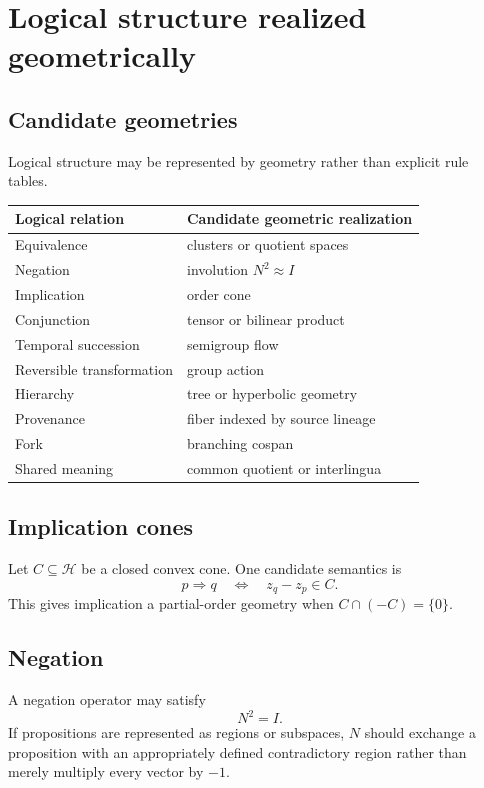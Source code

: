 \documentclass[11pt]{article}
\theoremstyle{definition}
\theoremstyle{remark}
\newcommand{\Lat}{\mathcal H}
\begin{document}
\section{Logical structure realized geometrically}

\subsection{Candidate geometries}

Logical structure may be represented by geometry rather than explicit rule tables.

\begin{center}
\begin{tabular}{ll}
\toprule
Logical relation & Candidate geometric realization \\
\midrule
Equivalence & clusters or quotient spaces \\
Negation & involution \(N^2\approx I\) \\
Implication & order cone \\
Conjunction & tensor or bilinear product \\
Temporal succession & semigroup flow \\
Reversible transformation & group action \\
Hierarchy & tree or hyperbolic geometry \\
Provenance & fiber indexed by source lineage \\
Fork & branching cospan \\
Shared meaning & common quotient or interlingua \\
\bottomrule
\end{tabular}
\end{center}

\subsection{Implication cones}

Let \(C\subseteq\Lat\) be a closed convex cone. One candidate semantics is
\[
p\Rightarrow q
\quad\Longleftrightarrow\quad
z_q-z_p\in C.
\]
This gives implication a partial-order geometry when \(C\cap(-C)=\{0\}\).

\subsection{Negation}

A negation operator may satisfy
\[
N^2=I.
\]
If propositions are represented as regions or subspaces, \(N\) should exchange a proposition with an appropriately defined contradictory region rather than merely multiply every vector by \(-1\).
\end{document}
